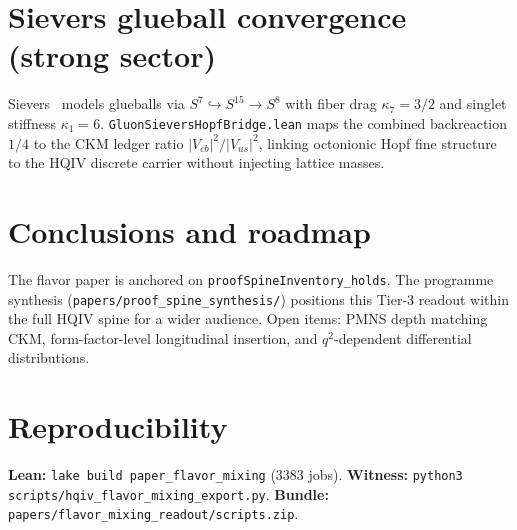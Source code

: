\documentclass[11pt]{amsart}
\begin{document}
\section{Sievers glueball convergence (strong sector)}
Sievers~\cite{Sievers2026Glueball} models glueballs via $S^7\hookrightarrow S^{15}\to S^8$
with fiber drag $\kappa_7=3/2$ and singlet stiffness $\kappa_1=6$.
\texttt{GluonSieversHopfBridge.lean} maps the combined backreaction $1/4$ to the CKM
ledger ratio $|V_{cb}|^2/|V_{us}|^2$, linking octonionic Hopf fine structure to the
HQIV discrete carrier without injecting lattice masses.

\section{Conclusions and roadmap}
The flavor paper is anchored on \texttt{proofSpineInventory\_holds}.
The programme synthesis (\texttt{papers/proof\_spine\_synthesis/}) positions this Tier-3
readout within the full HQIV spine for a wider audience.
Open items: PMNS depth matching CKM, form-factor-level longitudinal insertion, and
$q^2$-dependent differential distributions.

\section*{Reproducibility}
\textbf{Lean:} \texttt{lake build paper\_flavor\_mixing} (3383 jobs).
\textbf{Witness:} \texttt{python3 scripts/hqiv\_flavor\_mixing\_export.py}.
\textbf{Bundle:} \texttt{papers/flavor\_mixing\_readout/scripts.zip}.



\end{document}
